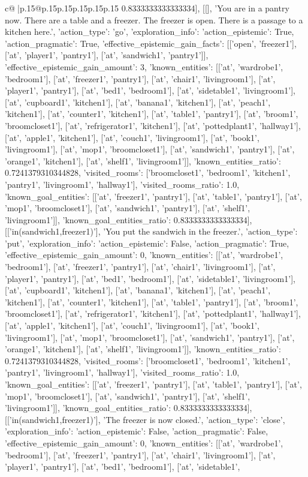 \documentclass{article}
\begin{document}
{\begin{supertabular}{c@{$\;$}|p{.15\linewidth}@{}p{.15\linewidth}p{.15\linewidth}p{.15\linewidth}p{.15\linewidth}p{.15\linewidth}}
{{{0.8333333333333334}}], [[], 'You are in a pantry now. There are a table and a freezer. The freezer is open. There is a passage to a kitchen here.', {'action_type': 'go', 'exploration_info': {'action_epistemic': True, 'action_pragmatic': True, 'effective_epistemic_gain_facts': [['open', 'freezer1'], ['at', 'player1', 'pantry1'], ['at', 'sandwich1', 'pantry1']], 'effective_epistemic_gain_amount': 3, 'known_entities': [['at', 'wardrobe1', 'bedroom1'], ['at', 'freezer1', 'pantry1'], ['at', 'chair1', 'livingroom1'], ['at', 'player1', 'pantry1'], ['at', 'bed1', 'bedroom1'], ['at', 'sidetable1', 'livingroom1'], ['at', 'cupboard1', 'kitchen1'], ['at', 'banana1', 'kitchen1'], ['at', 'peach1', 'kitchen1'], ['at', 'counter1', 'kitchen1'], ['at', 'table1', 'pantry1'], ['at', 'broom1', 'broomcloset1'], ['at', 'refrigerator1', 'kitchen1'], ['at', 'pottedplant1', 'hallway1'], ['at', 'apple1', 'kitchen1'], ['at', 'couch1', 'livingroom1'], ['at', 'book1', 'livingroom1'], ['at', 'mop1', 'broomcloset1'], ['at', 'sandwich1', 'pantry1'], ['at', 'orange1', 'kitchen1'], ['at', 'shelf1', 'livingroom1']], 'known_entities_ratio': 0.7241379310344828, 'visited_rooms': ['broomcloset1', 'bedroom1', 'kitchen1', 'pantry1', 'livingroom1', 'hallway1'], 'visited_rooms_ratio': 1.0, 'known_goal_entities': [['at', 'freezer1', 'pantry1'], ['at', 'table1', 'pantry1'], ['at', 'mop1', 'broomcloset1'], ['at', 'sandwich1', 'pantry1'], ['at', 'shelf1', 'livingroom1']], 'known_goal_entities_ratio': 0.8333333333333334}}], [['in(sandwich1,freezer1)'], 'You put the sandwich in the freezer.', {'action_type': 'put', 'exploration_info': {'action_epistemic': False, 'action_pragmatic': True, 'effective_epistemic_gain_amount': 0, 'known_entities': [['at', 'wardrobe1', 'bedroom1'], ['at', 'freezer1', 'pantry1'], ['at', 'chair1', 'livingroom1'], ['at', 'player1', 'pantry1'], ['at', 'bed1', 'bedroom1'], ['at', 'sidetable1', 'livingroom1'], ['at', 'cupboard1', 'kitchen1'], ['at', 'banana1', 'kitchen1'], ['at', 'peach1', 'kitchen1'], ['at', 'counter1', 'kitchen1'], ['at', 'table1', 'pantry1'], ['at', 'broom1', 'broomcloset1'], ['at', 'refrigerator1', 'kitchen1'], ['at', 'pottedplant1', 'hallway1'], ['at', 'apple1', 'kitchen1'], ['at', 'couch1', 'livingroom1'], ['at', 'book1', 'livingroom1'], ['at', 'mop1', 'broomcloset1'], ['at', 'sandwich1', 'pantry1'], ['at', 'orange1', 'kitchen1'], ['at', 'shelf1', 'livingroom1']], 'known_entities_ratio': 0.7241379310344828, 'visited_rooms': ['broomcloset1', 'bedroom1', 'kitchen1', 'pantry1', 'livingroom1', 'hallway1'], 'visited_rooms_ratio': 1.0, 'known_goal_entities': [['at', 'freezer1', 'pantry1'], ['at', 'table1', 'pantry1'], ['at', 'mop1', 'broomcloset1'], ['at', 'sandwich1', 'pantry1'], ['at', 'shelf1', 'livingroom1']], 'known_goal_entities_ratio': 0.8333333333333334}}], [['in(sandwich1,freezer1)'], 'The freezer is now closed.', {'action_type': 'close', 'exploration_info': {'action_epistemic': False, 'action_pragmatic': False, 'effective_epistemic_gain_amount': 0, 'known_entities': [['at', 'wardrobe1', 'bedroom1'], ['at', 'freezer1', 'pantry1'], ['at', 'chair1', 'livingroom1'], ['at', 'player1', 'pantry1'], ['at', 'bed1', 'bedroom1'], ['at', 'sidetable1', }}}
\end{supertabular}}
\end{document}
